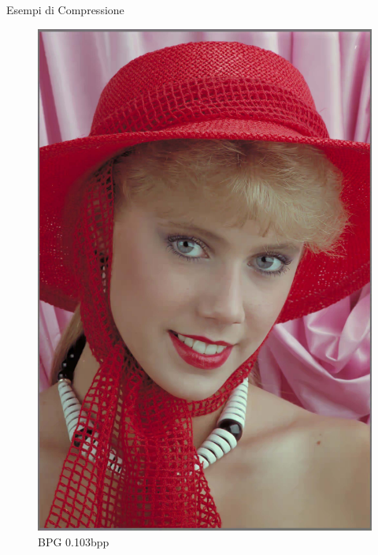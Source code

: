 \begin{frame}{Esempi di Compressione}
\begin{figure}[!ht]
\begin{minipage}[]{0.13\linewidth}
                \includegraphics[width=\textwidth]{Immagini/IMAGES/BPG_2_IMG0004.pdf}
                \caption{BPG 0.103bpp}
                \label{fig:ExampleBPG}
            \end{minipage}
            \begin{minipage}[]{0.13\linewidth}
                \centering

\end{minipage}
\end{figure}
\end{frame}
